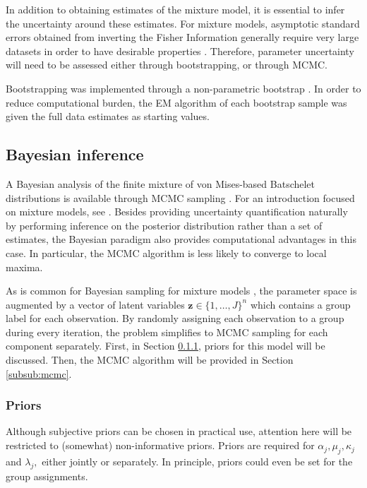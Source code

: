 In addition to obtaining estimates of the mixture model, it is essential to infer the uncertainty around these estimates. For mixture models, asymptotic standard errors obtained from inverting the Fisher Information generally require very large datasets in order to have desirable properties \citep{mclachlan2004finite}. Therefore, parameter uncertainty will need to be assessed either through bootstrapping, or through MCMC.

Bootstrapping was implemented through a non-parametric bootstrap \citep{efron1994introduction}. In order to reduce computational burden, the EM algorithm of each bootstrap sample was given the full data estimates as starting values.

\subsection{Bayesian inference}
\label{sub:bayes}

A Bayesian analysis of the finite mixture of von Mises-based Batschelet distributions is available through MCMC sampling \citep{chib1995understanding, gilks1995markov}. For an introduction focused on mixture models, see \citet{fruhwirth2006finite}. Besides providing uncertainty quantification naturally by performing inference on the posterior distribution rather than a set of estimates, the Bayesian paradigm also provides computational advantages in this case. In particular, the MCMC algorithm is less likely to converge to local maxima.

As is common for Bayesian sampling for mixture models , the parameter space is augmented by a vector of latent variables \(\boldsymbol{z} \in \{1, \dots, J\}^n\) which contains a group label for each observation. By randomly assigning each observation to a group during every iteration, the problem simplifies to MCMC sampling for each component separately. First, in Section \ref{subsub:priors}, priors for this model will be discussed. Then, the MCMC algorithm will be provided in Section \ref{subsub:mcmc}.

\subsubsection{Priors}
\label{subsub:priors}

Although subjective priors can be chosen in practical use, attention here will be restricted to (somewhat) non-informative priors. Priors are required for \(\alpha_j, \mu_j, \kappa_j\) and \(\lambda_j,\) either jointly or separately. In principle, priors could even be set for the group assignments.

